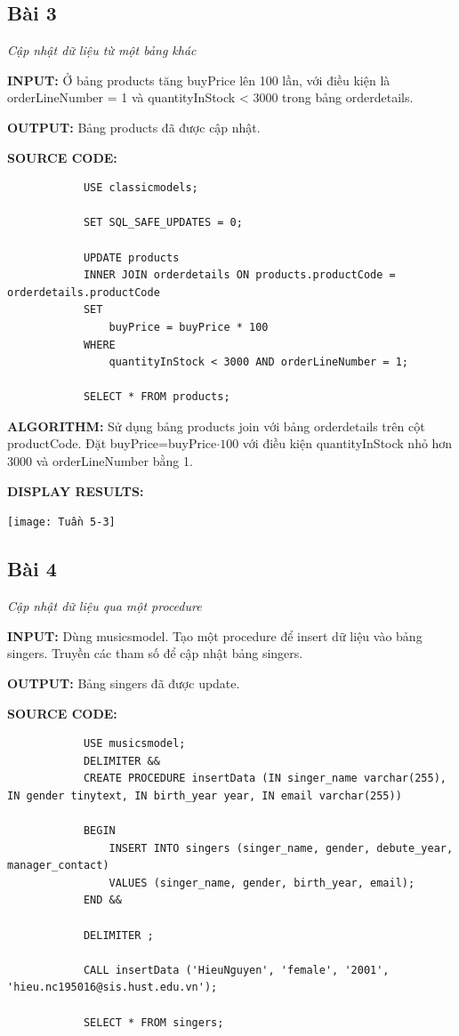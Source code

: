 \documentclass[12pt,a4paper]{report}
\begin{document}
\subsection{Bài 3}
	\begin{center}
		{\it Cập nhật dữ liệu từ một bảng khác}
	\end{center}
	
	{\bf INPUT:} Ở bảng products tăng buyPrice lên 100 lần, với điều kiện là orderLineNumber = 1 và quantityInStock < 3000 trong bảng orderdetails.
	
	{\bf OUTPUT:} Bảng products đã được cập nhật.
	
	{\bf SOURCE CODE:}
		\begin{lstlisting}
			USE classicmodels;
			
			SET SQL_SAFE_UPDATES = 0;
			
			UPDATE products
			INNER JOIN orderdetails ON products.productCode = orderdetails.productCode
			SET
				buyPrice = buyPrice * 100
			WHERE
				quantityInStock < 3000 AND orderLineNumber = 1;
				
			SELECT * FROM products;
		\end{lstlisting}
		
	{\bf ALGORITHM:} Sử dụng bảng products join với bảng orderdetails trên cột productCode. Đặt buyPrice=buyPrice$\cdot100$ với điều kiện quantityInStock nhỏ hơn 3000 và orderLineNumber bằng 1.
	
	{\bf DISPLAY RESULTS:}
		\begin{center}
			\texttt{[image: Tuần 5-3]}
		\end{center}
\subsection{Bài 4}
	\begin{center}
		{\it Cập nhật dữ liệu qua một procedure}	
	\end{center}
	
	{\bf INPUT:} Dùng musicsmodel. Tạo một procedure để insert dữ liệu vào bảng singers. Truyền các tham số để cập nhật bảng singers.
	
	{\bf OUTPUT:} Bảng singers đã được update.
	
	{\bf SOURCE CODE:}
		\begin{lstlisting}
			USE musicsmodel;
			DELIMITER &&
			CREATE PROCEDURE insertData (IN singer_name varchar(255), IN gender tinytext, IN birth_year year, IN email varchar(255))
    
    		BEGIN 
				INSERT INTO singers (singer_name, gender, debute_year, manager_contact)
        		VALUES (singer_name, gender, birth_year, email);
    		END &&

			DELIMITER ;

			CALL insertData ('HieuNguyen', 'female', '2001', 'hieu.nc195016@sis.hust.edu.vn');

			SELECT * FROM singers;
		\end{lstlisting}
		
\end{document}
